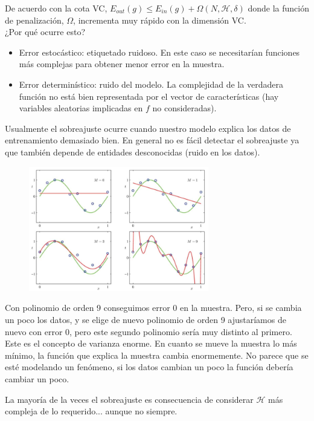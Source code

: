 \documentclass[11pt,a4paper]{article}
\theoremstyle{definition}
\begin{document}
	De acuerdo con la cota VC, $E_{out}(g)\leq E_{in}(g)+\Omega (N,\mathcal{H},\delta)$ donde la función de penalización, $\Omega$, incrementa muy rápido con la dimensión VC.\\
	
	¿Por qué ocurre esto?
	
	\begin{itemize}
		\item Error estocástico: etiquetado ruidoso. En este caso se necesitarían funciones más complejas para obtener menor error en la muestra.
		\item Error determinístico: ruido del modelo. La complejidad de la verdadera función no está bien representada por el vector de características (hay variables aleatorias implicadas en $f$ no consideradas).
	\end{itemize}
	 
	 Usualmente el sobreajuste ocurre cuando nuestro modelo explica los datos de entrenamiento demasiado bien. En general no es fácil detectar el sobreajuste ya que también depende de entidades desconocidas (ruido en los datos).
	\begin{figure}[H]
		\centering
		\includegraphics[width=0.7\textwidth]{images/overfitting_example}
	\end{figure}
	
	Con polinomio de orden 9 conseguimos error 0 en la muestra. Pero, si se cambia un poco los datos, y se elige de nuevo polinomio de orden 9 ajustaríamos de nuevo con error 0, pero este segundo polinomio sería muy distinto al primero. Este es el concepto de varianza enorme. En cuanto se mueve la muestra lo más mínimo, la función que explica la muestra cambia enormemente. No parece que se esté modelando un fenómeno, si los datos cambian un poco la función debería cambiar un poco.
	
	La mayoría de la veces el sobreajuste es consecuencia de considerar $\mathcal{H}$ más compleja de lo requerido... aunque no siempre.\\
	
\end{document}
